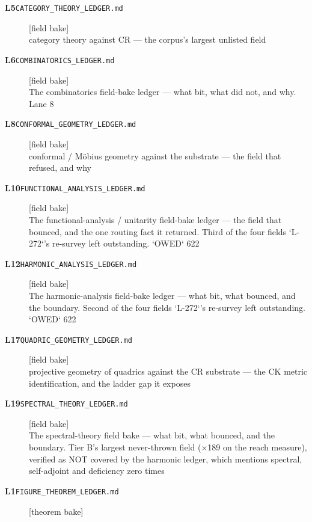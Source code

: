 \begin{description}
\item[\textbf{L5}\quad\texttt{CATEGORY\_THEORY\_LEDGER.md}]\hfill\textsf{[field bake]}\\
category theory against CR --- the corpus's largest unlisted field
\item[\textbf{L6}\quad\texttt{COMBINATORICS\_LEDGER.md}]\hfill\textsf{[field bake]}\\
The combinatorics field-bake ledger --- what bit, what did not, and why. Lane 8
\item[\textbf{L8}\quad\texttt{CONFORMAL\_GEOMETRY\_LEDGER.md}]\hfill\textsf{[field bake]}\\
conformal / M\"obius geometry against the substrate --- the field that refused, and why
\item[\textbf{L10}\quad\texttt{FUNCTIONAL\_ANALYSIS\_LEDGER.md}]\hfill\textsf{[field bake]}\\
The functional-analysis / unitarity field-bake ledger --- the field that bounced, and the one routing fact it returned. Third of the four fields `L-272`'s re-survey left outstanding. `OWED` 622
\item[\textbf{L12}\quad\texttt{HARMONIC\_ANALYSIS\_LEDGER.md}]\hfill\textsf{[field bake]}\\
The harmonic-analysis field-bake ledger --- what bit, what bounced, and the boundary. Second of the four fields `L-272`'s re-survey left outstanding. `OWED` 622
\item[\textbf{L17}\quad\texttt{QUADRIC\_GEOMETRY\_LEDGER.md}]\hfill\textsf{[field bake]}\\
projective geometry of quadrics against the CR substrate --- the CK metric identification, and the ladder gap it exposes
\item[\textbf{L19}\quad\texttt{SPECTRAL\_THEORY\_LEDGER.md}]\hfill\textsf{[field bake]}\\
The spectral-theory field bake --- what bit, what bounced, and the boundary. Tier B's largest never-thrown field ($\times$189 on the reach measure), verified as NOT covered by the harmonic ledger, which mentions spectral, self-adjoint and deficiency zero times
\item[\textbf{L1}\quad\texttt{FIGURE\_THEOREM\_LEDGER.md}]\hfill\textsf{[theorem bake]}\\

\end{description}
